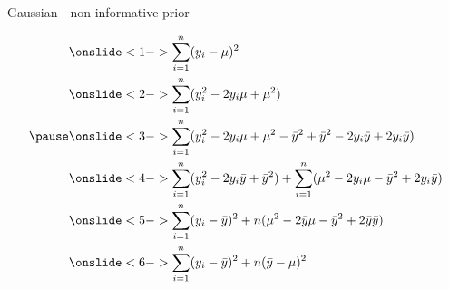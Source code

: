 \documentclass[10pt,handout]{beamer}
\begin{document}
\begin{frame}{Gaussian - non-informative prior}

  \vspace{-\baselineskip}
 \begin{align*}
   &\onslide<1->{\sum_{i=1}^n(y_i-\mu)^2}\\
   &\onslide<2->{\sum_{i=1}^n(y_i^2-2 y_i \mu + \mu^2)}\\
\pause
   &\onslide<3->{\sum_{i=1}^n(y_i^2-2 y_i \mu + \mu^2 -\bar{y}^2 + \bar{y}^2 - 2 y_i \bar{y} + 2 y_i \bar{y})}\\
   &\onslide<4->{\sum_{i=1}^n(y_i^2-2 y_i \bar{y} + \bar{y}^2) + \sum_{i=1}^n(\mu^2 - 2 y_i \mu -\bar{y}^2  + 2 y_i \bar{y})}\\
   &\onslide<5->{\sum_{i=1}^n(y_i-\bar{y})^2 + n(\mu^2 -  2\bar{y}\mu -\bar{y}^2  + 2 \bar{y}\bar{y})}\\
   &\onslide<6->{\sum_{i=1}^n(y_i-\bar{y})^2 + n(\bar{y}-\mu)^2}
 \end{align*}

\end{frame}
\end{document}
